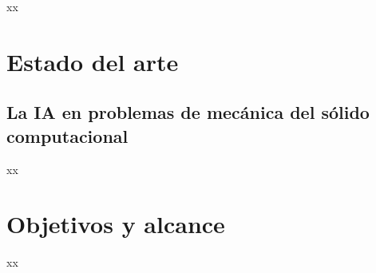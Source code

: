 xx


\section{Estado del arte}

\subsection{La IA en problemas de mecánica del sólido computacional}

xx


\section{Objetivos y alcance}

xx